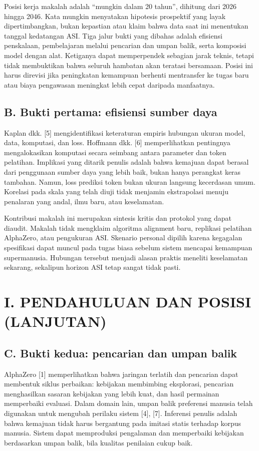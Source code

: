 \documentclass[conference,a4paper]{IEEEtran}
\begin{document}
Posisi kerja makalah adalah ``mungkin dalam 20 tahun'', dihitung dari 2026 hingga 2046. Kata mungkin menyatakan hipotesis prospektif yang layak dipertimbangkan, bukan kepastian atau klaim bahwa data saat ini menentukan tanggal kedatangan ASI. Tiga jalur bukti yang dibahas adalah efisiensi penskalaan, pembelajaran melalui pencarian dan umpan balik, serta komposisi model dengan alat. Ketiganya dapat memperpendek sebagian jarak teknis, tetapi tidak membuktikan bahwa seluruh hambatan akan teratasi bersamaan. Posisi ini harus direvisi jika peningkatan kemampuan berhenti mentransfer ke tugas baru atau biaya pengawasan meningkat lebih cepat daripada manfaatnya.

\subsection*{B. Bukti pertama: efisiensi sumber daya}
Kaplan dkk. [5] mengidentifikasi keteraturan empiris hubungan ukuran model, data, komputasi, dan loss. Hoffmann dkk. [6] memperlihatkan pentingnya mengalokasikan komputasi secara seimbang antara parameter dan token pelatihan. Implikasi yang ditarik penulis adalah bahwa kemajuan dapat berasal dari penggunaan sumber daya yang lebih baik, bukan hanya perangkat keras tambahan. Namun, loss prediksi token bukan ukuran langsung kecerdasan umum. Korelasi pada skala yang telah diuji tidak menjamin ekstrapolasi menuju penalaran yang andal, ilmu baru, atau keselamatan.

Kontribusi makalah ini merupakan sintesis kritis dan protokol yang dapat diaudit. Makalah tidak mengklaim algoritma alignment baru, replikasi pelatihan AlphaZero, atau pengukuran ASI. Skenario personal dipilih karena kegagalan spesifikasi dapat muncul pada tugas biasa sebelum sistem mencapai kemampuan supermanusia. Hubungan tersebut menjadi alasan praktis meneliti keselamatan sekarang, sekalipun horizon ASI tetap sangat tidak pasti.

\clearpage
\section*{I. PENDAHULUAN DAN POSISI (LANJUTAN)}
\subsection*{C. Bukti kedua: pencarian dan umpan balik}
AlphaZero [1] memperlihatkan bahwa jaringan terlatih dan pencarian dapat membentuk siklus perbaikan: kebijakan membimbing eksplorasi, pencarian menghasilkan sasaran kebijakan yang lebih kuat, dan hasil permainan memperbaiki evaluasi. Dalam domain lain, umpan balik preferensi manusia telah digunakan untuk mengubah perilaku sistem [4], [7]. Inferensi penulis adalah bahwa kemajuan tidak harus bergantung pada imitasi statis terhadap korpus manusia. Sistem dapat memproduksi pengalaman dan memperbaiki kebijakan berdasarkan umpan balik, bila kualitas penilaian cukup baik.
\end{document}
